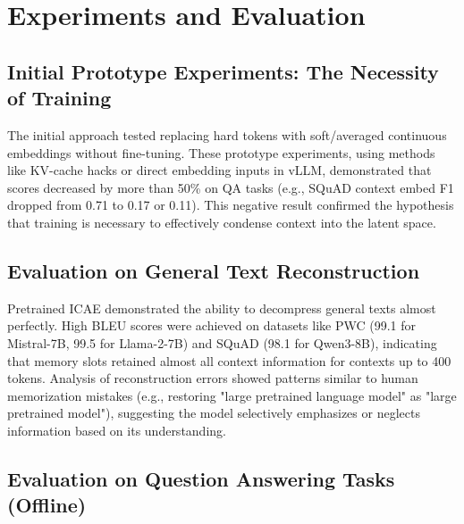 \chapter{Experiments and Evaluation}


\section{Initial Prototype Experiments: The Necessity of Training}

The initial approach tested replacing hard tokens with soft/averaged continuous embeddings without fine-tuning. These prototype experiments, using methods like KV-cache hacks or direct embedding inputs in vLLM, demonstrated that scores decreased by more than 50\% on QA tasks (e.g., SQuAD context embed F1 dropped from 0.71 to 0.17 or 0.11). This negative result confirmed the hypothesis that training is necessary to effectively condense context into the latent space.


\section{Evaluation on General Text Reconstruction}

Pretrained ICAE demonstrated the ability to decompress general texts almost perfectly. High BLEU scores were achieved on datasets like PWC (99.1 for Mistral-7B, 99.5 for Llama-2-7B) and SQuAD (98.1 for Qwen3-8B), indicating that memory slots retained almost all context information for contexts up to 400 tokens. Analysis of reconstruction errors showed patterns similar to human memorization mistakes (e.g., restoring "large pretrained language model" as "large pretrained model"), suggesting the model selectively emphasizes or neglects information based on its understanding.


\section{Evaluation on Question Answering Tasks (Offline)}

